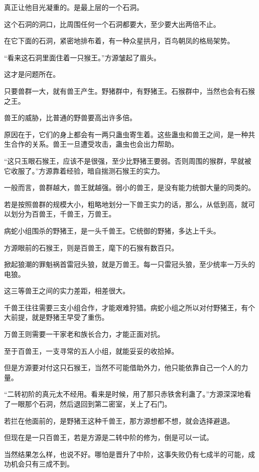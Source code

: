 \begin{this_body}
真正让他目光凝重的。是最上层的一个石洞。

这个石洞的洞口，比周围任何一个石洞都要大，至少要大出两倍不止。

在它下面的石洞，紧密地排布着，有一种众星拱月，百鸟朝凤的格局架势。

“看来这石洞里面住着一只猴王。”方源皱起了眉头。

这才是问题所在。

只要兽群一大，就有兽王产生。野猪群中，有野猪王。石猴群中，当然也会有石猴之王。

兽王的威胁，比普通的野兽要高出许多倍。

原因在于，它们的身上都会有一两只蛊虫寄生着。这些蛊虫和兽王之间，是一种共生合作的关系。兽王一旦遭受攻击，蛊虫也会出力帮助。

“这只玉眼石猴王，应该不是很强，至少比野猪王要弱。否则周围的猴群，早就被它收服了。”方源靠着经验，暗自揣测石猴王的实力。

一般而言，兽群越大，兽王就越强。弱小的兽王，是没有能力统御大量的同类的。

若是按照兽群的规模大小，粗略地划分一下兽王实力的话，那么，从低到高，就可以划分为百兽王，千兽王，万兽王。

病蛇小组围杀的野猪王，是一头千兽王。它统御的野猪，多达上千头。

方源眼前的石猴王，则是百兽王，麾下的石猴有数百只。

掀起狼潮的罪魁祸首雷冠头狼，就是万兽王。每一只雷冠头狼，至少统率一万头的电狼。

这三等兽王之间的实力差距，相差很大。

千兽王往往需要三支小组合作，才能艰难狩猎。病蛇小组之所以对付野猪王，有个大前提，就是野猪王早受了重伤。

万兽王则需要一干家老和族长合力，才能正面对抗。

至于百兽王，一支寻常的五人小组，就能妥妥的收拾掉。

但是方源要对付这只石猴王，当然不可能借助外力，他只能依靠自己一个人的力量。

“二转初阶的真元太不经用。看来是时候，用了那只赤铁舍利蛊了。”方源深深地看了一眼那个石洞，然后退回到第二密室，关上了石门。

若拦在他面前的，是野猪王这种千兽王，那方源想都不想，就会选择避退。

但现在是一只百兽王，若是方源是二转中阶的修为，倒是可以一试。

当然结果怎么样，也说不好。哪怕是晋升了中阶，这事失败仍有七成半的可能，成功机会只有三成不到。

\end{this_body}

